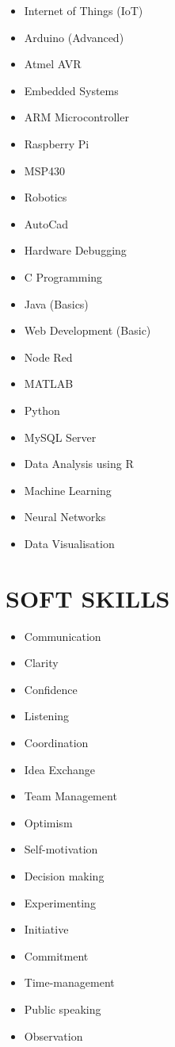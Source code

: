 \documentclass[margin, 11pt]{res} %
\begin{document}
\begin{resume}
\begin{multicols}{2}
	\begin{itemize}
		\item Internet of Things (IoT)
		\item Arduino (Advanced)
		\item Atmel AVR
		\item Embedded Systems
		\item ARM Microcontroller
		\item Raspberry Pi
		\item MSP430
		\item Robotics
		\item AutoCad
		\item Hardware Debugging
		\item C Programming
		\item Java (Basics)
		\item Web Development (Basic)
		\item Node Red
		\item MATLAB
		\item Python
		\item MySQL Server
		\item Data Analysis using R
		\item Machine Learning
		\item Neural Networks
		\item Data Visualisation
	\end{itemize}
\end{multicols}


\vspace{.15in}
\section{SOFT SKILLS}

\begin{multicols}{2}
	\begin{itemize}
		\item Communication
		\item Clarity
		\item Confidence
		\item Listening
		\item Coordination
		\item Idea Exchange
		\item Team Management
		\item Optimism
		\item Self-motivation
		\item Decision making
		\item Experimenting
		\item Initiative
		\item Commitment
		\item Time-management
		\item Public speaking
		\item Observation
	\end{itemize}
\end{multicols}



\end{resume}
\end{document}
